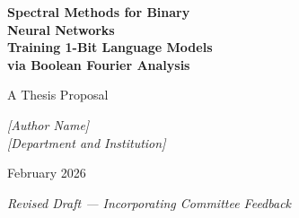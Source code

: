 \documentclass[12pt,a4paper]{article}
\theoremstyle{plain}
\theoremstyle{definition}
\theoremstyle{remark}
\newcommand{\placeholder}[1]{{\color{gray}\textit{[#1]}}}
\begin{document}
\begin{titlepage}
\centering
\vspace*{3cm}

{\LARGE\bfseries Spectral Methods for Binary\\[6pt] Neural Networks}\\[18pt]
{\Large\bfseries Training 1-Bit Language Models\\[4pt] via Boolean Fourier Analysis}

\vspace{2cm}

{\large A Thesis Proposal}

\vspace{1.5cm}

{\large \placeholder{Author Name}}\\[6pt]
{\large \placeholder{Department and Institution}}

\vspace{1.5cm}

{\large February 2026}

\vspace{1.5cm}

{\color{gray}\textit{Revised Draft --- Incorporating Committee Feedback}}

\end{titlepage}
\end{document}
